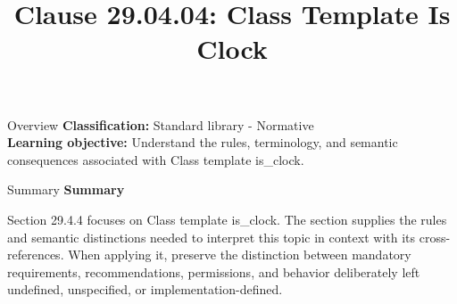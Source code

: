 \documentclass[10pt,letterpaper]{article}
\title{Clause 29.04.04: Class Template Is Clock}
\author{}
\date{}
\begin{document}
\maketitle
\begin{CornellOverviewBox}{Overview}
\textbf{Classification:} Standard library - Normative\\[2pt]
\textbf{Learning objective:} Understand the rules, terminology, and semantic consequences associated with Class template is\_clock.
\end{CornellOverviewBox}\begin{CornellSummaryBox}{Summary}
{\sffamily\bfseries\color{Accent} Summary}\par\vspace{3pt}Section 29.4.4 focuses on Class template is\_clock. The section supplies the rules and semantic distinctions needed to interpret this topic in context with its cross-references. When applying it, preserve the distinction between mandatory requirements, recommendations, permissions, and behavior deliberately left undefined, unspecified, or implementation-defined.
\end{CornellSummaryBox}
\end{document}
